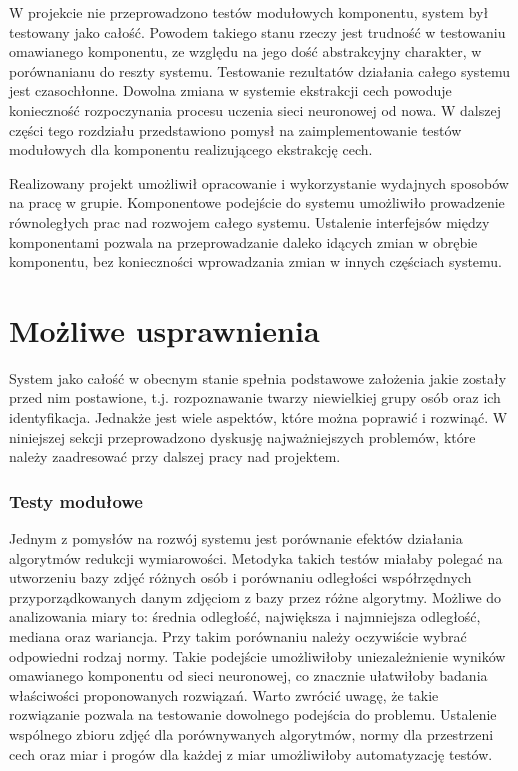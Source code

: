 \documentclass[oneside, eng]{mgr}
\begin{document}
W projekcie nie przeprowadzono testów modułowych komponentu, system był testowany jako całość. Powodem takiego stanu rzeczy jest trudność w testowaniu omawianego komponentu, ze względu na jego dość abstrakcyjny charakter, w porównanianu do reszty systemu. Testowanie rezultatów działania całego systemu jest czasochłonne. Dowolna zmiana w systemie ekstrakcji cech powoduje konieczność rozpoczynania procesu uczenia sieci neuronowej od nowa. W dalszej części tego rozdziału przedstawiono pomysł na zaimplementowanie testów modułowych dla komponentu realizującego ekstrakcję cech.

Realizowany projekt umożliwił opracowanie i wykorzystanie wydajnych sposobów na pracę w grupie. Komponentowe podejście do systemu umożliwiło prowadzenie równoległych prac nad rozwojem całego systemu. Ustalenie interfejsów między komponentami pozwala na przeprowadzanie daleko idących zmian w obrębie komponentu, bez konieczności wprowadzania zmian w innych częściach systemu.

\section{Możliwe usprawnienia}

System jako całość w obecnym stanie spełnia podstawowe założenia jakie zostały przed nim postawione, t.j. rozpoznawanie twarzy niewielkiej grupy osób oraz ich identyfikacja. Jednakże jest wiele aspektów, które można poprawić i rozwinąć. W niniejszej sekcji przeprowadzono dyskusję najważniejszych problemów, które należy zaadresować przy dalszej pracy nad projektem.

\subsubsection{Testy modułowe}

Jednym z pomysłów na rozwój systemu jest porównanie efektów działania algorytmów redukcji wymiarowości. Metodyka takich testów miałaby polegać na utworzeniu bazy zdjęć różnych osób i porównaniu odległości współrzędnych przyporządkowanych danym zdjęciom z bazy przez różne algorytmy. Możliwe do analizowania miary to: średnia odległość, największa i najmniejsza odległość, mediana oraz wariancja. Przy takim porównaniu należy oczywiście wybrać odpowiedni rodzaj normy. Takie podejście umożliwiłoby uniezależnienie wyników omawianego komponentu od sieci neuronowej, co znacznie ułatwiłoby badania właściwości proponowanych rozwiązań. Warto zwrócić uwagę, że takie rozwiązanie pozwala na testowanie dowolnego podejścia do problemu. Ustalenie wspólnego zbioru zdjęć dla porównywanych algorytmów, normy dla przestrzeni cech oraz miar i progów dla każdej z miar umożliwiłoby automatyzację testów.
\end{document}
